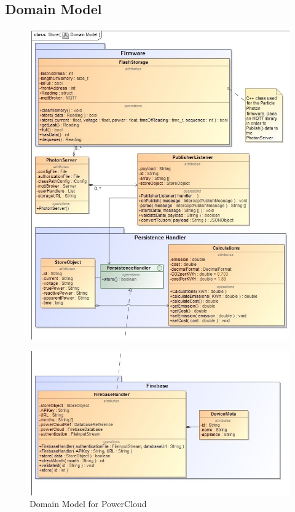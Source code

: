 \documentclass{article}
\begin{document}
	\subsection{Domain Model}
	\begin{figure}[H]
		\includegraphics[scale=0.7]{images/Domain Model.jpg}
	\end{figure}
	\begin{figure}[H]	
		\includegraphics[scale=0.7]{images/Domain Model (2).jpg}
		\caption{Domain Model for PowerCloud \label{overflow}}
	\end{figure}
\end{document}
